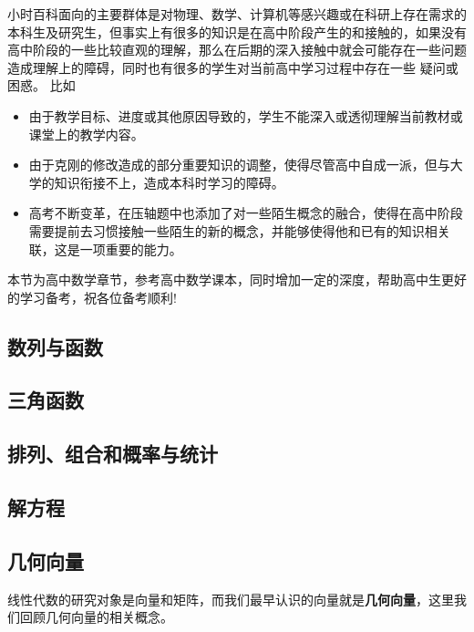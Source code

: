 
\begin{issues}
\issueDraft
\end{issues}

小时百科面向的主要群体是对物理、数学、计算机等感兴趣或在科研上存在需求的本科生及研究生，但事实上有很多的知识是在高中阶段产生的和接触的，如果没有高中阶段的一些比较直观的理解，那么在后期的深入接触中就会可能存在一些问题造成理解上的障碍，同时也有很多的学生对当前高中学习过程中存在一些 疑问或困惑。 比如
\begin{itemize}
\item 由于教学目标、进度或其他原因导致的，学生不能深入或透彻理解当前教材或课堂上的教学内容。
\item 由于克刚的修改造成的部分重要知识的调整，使得尽管高中自成一派，但与大学的知识衔接不上，造成本科时学习的障碍。
\item 高考不断变革，在压轴题中也添加了对一些陌生概念的融合，使得在高中阶段需要提前去习惯接触一些陌生的新的概念，并能够使得他和已有的知识相关联，这是一项重要的能力。
\end{itemize}

本节为高中数学章节，参考高中数学课本，同时增加一定的深度，帮助高中生更好的学习备考，祝各位备考顺利!

\subsection{数列与函数}

\subsection{三角函数}

\subsection{排列、组合和概率与统计}

\subsection{解方程}

\subsection{几何向量}

线性代数的研究对象是向量和矩阵，而我们最早认识的向量就是\textbf{几何向量}，这里我们回顾几何向量的相关概念。

